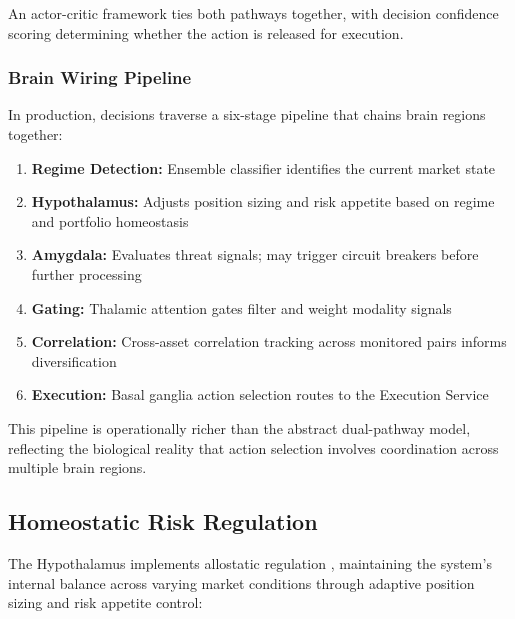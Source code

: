 \documentclass[12pt, a4paper]{article}
\begin{document}
An actor-critic framework ties both pathways together, with decision confidence scoring determining whether the action is released for execution.

\subsubsection{Brain Wiring Pipeline}

In production, decisions traverse a six-stage pipeline that chains brain regions together:

\begin{enumerate}
	\item \textbf{Regime Detection:} Ensemble classifier identifies the current market state
	\item \textbf{Hypothalamus:} Adjusts position sizing and risk appetite based on regime and portfolio homeostasis
	\item \textbf{Amygdala:} Evaluates threat signals; may trigger circuit breakers before further processing
	\item \textbf{Gating:} Thalamic attention gates filter and weight modality signals
	\item \textbf{Correlation:} Cross-asset correlation tracking across monitored pairs informs diversification
	\item \textbf{Execution:} Basal ganglia action selection routes to the Execution Service
\end{enumerate}

This pipeline is operationally richer than the abstract dual-pathway model, reflecting the biological reality that action selection involves coordination across multiple brain regions.

\subsection{Homeostatic Risk Regulation}
\label{sec:hypothalamus}

The Hypothalamus implements allostatic regulation \citep{sterling2012allostasis}, maintaining the system's internal balance across varying market conditions through adaptive position sizing and risk appetite control:
\end{document}
